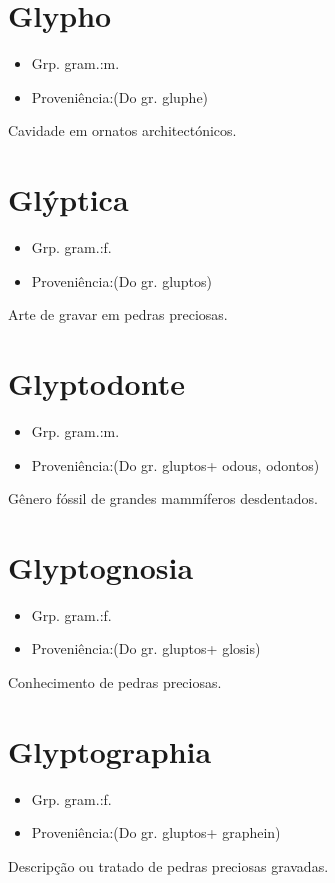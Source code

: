 \section{Glypho}
\begin{itemize}
\item {Grp. gram.:m.}
\end{itemize}
\begin{itemize}
\item {Proveniência:(Do gr. \textunderscore gluphe\textunderscore )}
\end{itemize}
Cavidade em ornatos architectónicos.
\section{Glýptica}
\begin{itemize}
\item {Grp. gram.:f.}
\end{itemize}
\begin{itemize}
\item {Proveniência:(Do gr. \textunderscore gluptos\textunderscore )}
\end{itemize}
Arte de gravar em pedras preciosas.
\section{Glyptodonte}
\begin{itemize}
\item {Grp. gram.:m.}
\end{itemize}
\begin{itemize}
\item {Proveniência:(Do gr. \textunderscore gluptos\textunderscore  + \textunderscore odous\textunderscore , \textunderscore odontos\textunderscore )}
\end{itemize}
Gênero fóssil de grandes mammíferos desdentados.
\section{Glyptognosia}
\begin{itemize}
\item {Grp. gram.:f.}
\end{itemize}
\begin{itemize}
\item {Proveniência:(Do gr. \textunderscore gluptos\textunderscore  + \textunderscore glosis\textunderscore )}
\end{itemize}
Conhecimento de pedras preciosas.
\section{Glyptographia}
\begin{itemize}
\item {Grp. gram.:f.}
\end{itemize}
\begin{itemize}
\item {Proveniência:(Do gr. \textunderscore gluptos\textunderscore  + \textunderscore graphein\textunderscore )}
\end{itemize}
Descripção ou tratado de pedras preciosas gravadas.
